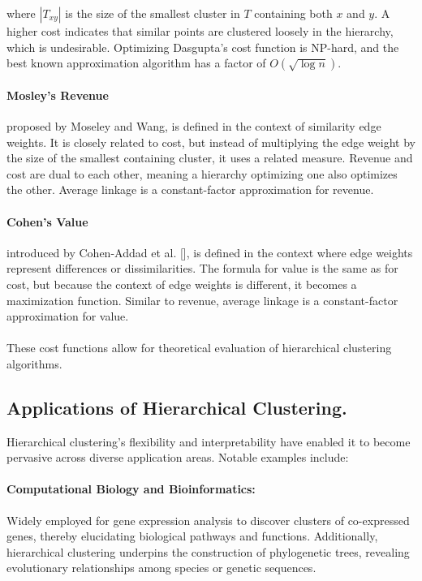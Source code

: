 where $|T_{xy}|$ is the size of the smallest cluster in $T$
containing both $x$ and $y$. A higher cost indicates that similar
points are clustered loosely in the hierarchy, which is undesirable.
Optimizing Dasgupta's cost function is NP-hard, and the best known
approximation algorithm has a factor of $O(\sqrt{\log n})$.

\paragraph{Mosley's Revenue}
proposed by Moseley and Wang, is defined in the
context of similarity edge weights. It is closely related to cost,
but instead of multiplying the edge weight by the size of the
smallest containing cluster, it uses a related measure. Revenue and
cost are dual to each other, meaning a hierarchy optimizing one also
optimizes the other. Average linkage is a constant-factor
approximation for revenue.

\paragraph{Cohen's Value}
introduced by Cohen-Addad et al.
[\cite{cohen}], is defined in the context where edge
weights represent differences or dissimilarities. The formula for
value is the same as for cost, but because the context of edge
weights is different, it becomes a maximization function. Similar to
revenue, average linkage is a constant-factor approximation for value.

\paragraph{}These cost functions allow for theoretical evaluation of
hierarchical clustering algorithms.

\subsection{Applications of Hierarchical Clustering.}
Hierarchical clustering's flexibility and interpretability have
enabled it to become pervasive across diverse application areas.
Notable examples include:

\paragraph{Computational Biology and Bioinformatics:} Widely
employed for gene expression analysis to discover clusters of
co-expressed genes, thereby elucidating biological pathways and
functions. Additionally, hierarchical clustering underpins the
construction of phylogenetic trees, revealing evolutionary
relationships among species or genetic sequences.

